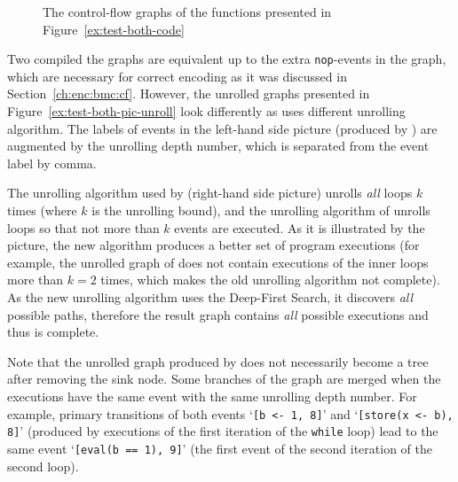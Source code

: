 \begin{figure}[!h]
\begin{minipage}{.49\textwidth}
\end{minipage}
%
\caption{The control-flow graphs of the functions presented in Figure~\ref{ex:test-both-code}}
\label{ex:test-both-pic}
\end{figure}

Two compiled the graphs are equivalent up to the extra \texttt{nop}-events in the \porthos[2] graph, which are necessary for correct encoding as it was discussed in Section~\ref{ch:enc:bmc:cf}.
However, the unrolled graphs presented in Figure~\ref{ex:test-both-pic-unroll} look differently as \porthos[2] uses different unrolling algorithm.
The labels of events in the left-hand side picture (produced by \porthos[2]) are augmented by the unrolling depth number, which is separated from the event label by comma.

The unrolling algorithm used by \porthos[1] (right-hand side picture) unrolls \textit{all} loops $k$ times (where $k$ is the unrolling bound), and the unrolling algorithm of \porthos[2] unrolls loops so that not more than $k$ events are executed.
As it is illustrated by the picture, the new algorithm produces a better set of program executions (for example, the unrolled graph of \porthos[1] does not contain executions of the inner loops more than $k=2$ times, which makes the old unrolling algorithm not complete).
As the new unrolling algorithm uses the Deep-First Search, it discovers \textit{all} possible paths, therefore the result graph contains \textit{all} possible executions and thus is complete.

Note that the unrolled graph produced by \porthos[2] does not necessarily become a tree after removing the sink node.
Some branches of the graph are merged when the executions have the same event with the same unrolling depth number.
For example, primary transitions of both events `\lstinline{[b <- 1, 8]}' and `\lstinline{[store(x <- b), 8]}' (produced by executions of the first iteration of the \texttt{while} loop) lead to the same event `\lstinline{[eval(b == 1), 9]}' (the first event of the second iteration of the second loop).

